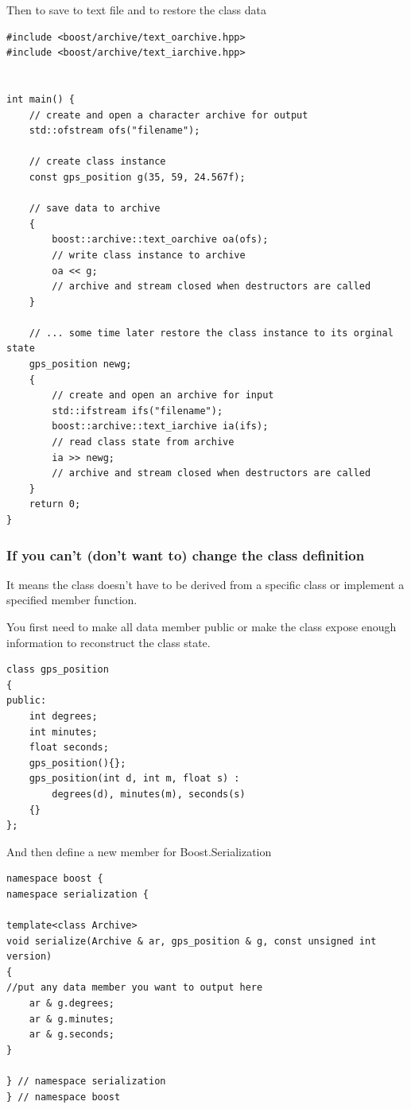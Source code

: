 Then to save to text file and to restore the class data
\begin{verbatim}
#include <boost/archive/text_oarchive.hpp>
#include <boost/archive/text_iarchive.hpp>


int main() {
    // create and open a character archive for output
    std::ofstream ofs("filename");

    // create class instance
    const gps_position g(35, 59, 24.567f);

    // save data to archive
    {
        boost::archive::text_oarchive oa(ofs);
        // write class instance to archive
        oa << g;
    	// archive and stream closed when destructors are called
    }

    // ... some time later restore the class instance to its orginal state
    gps_position newg;
    {
        // create and open an archive for input
        std::ifstream ifs("filename");
        boost::archive::text_iarchive ia(ifs);
        // read class state from archive
        ia >> newg;
        // archive and stream closed when destructors are called
    }
    return 0;
}
\end{verbatim}

\subsubsection{If you can't (don't want to) change the class definition}

It means the class doesn't have to be derived from a specific class or implement
a specified member function.

You first need to make all data member public or make the class expose enough
information to reconstruct the class state.
\begin{verbatim}
class gps_position
{
public:
    int degrees;
    int minutes;
    float seconds;
    gps_position(){};
    gps_position(int d, int m, float s) :
        degrees(d), minutes(m), seconds(s)
    {}
};
\end{verbatim}

And then define a new member for Boost.Serialization
\begin{verbatim}
namespace boost {
namespace serialization {

template<class Archive>
void serialize(Archive & ar, gps_position & g, const unsigned int version)
{
//put any data member you want to output here
    ar & g.degrees;
    ar & g.minutes;
    ar & g.seconds;
}

} // namespace serialization
} // namespace boost
\end{verbatim}

